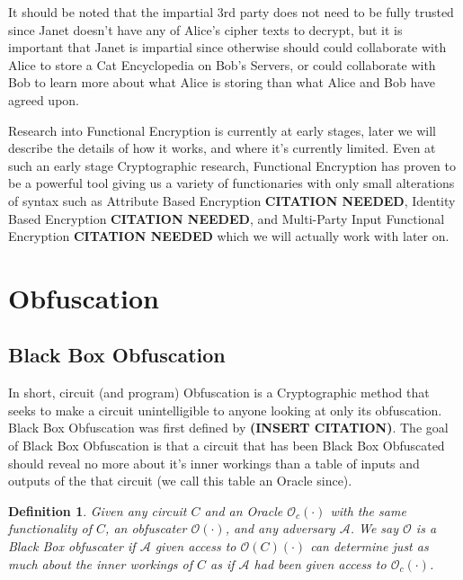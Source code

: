 \documentclass[12pt,twoside]{reedthesis}
\newtheorem{definition}{Definition}
\begin{document}
\par It should be noted that the impartial 3rd party does not need to be fully trusted since Janet doesn't have any of Alice's cipher texts to decrypt, but it is important that Janet is impartial since otherwise should could collaborate with Alice to store a Cat Encyclopedia on Bob's Servers, or could collaborate with Bob to learn more about what Alice is storing than what Alice and Bob have agreed upon.


\par Research into Functional Encryption is currently at early stages, later we will describe the details of how it works, and where it's currently limited. Even at such an early stage Cryptographic research, Functional Encryption has proven to be a powerful tool giving us a variety of functionaries with only small alterations of syntax such as Attribute Based Encryption \textbf{CITATION NEEDED}, Identity Based Encryption \textbf{CITATION NEEDED}, and Multi-Party Input Functional Encryption \textbf{CITATION NEEDED} which we will actually work with later on. 

    
    

    \section{Obfuscation}
    
    \subsection{Black Box Obfuscation}
    In short, circuit (and program) Obfuscation is a Cryptographic method that seeks to make a circuit
    unintelligible to anyone looking at only its obfuscation. Black Box Obfuscation was first defined by
    \textbf{(INSERT CITATION)}. The goal of Black Box Obfuscation is that a circuit that has been Black Box Obfuscated should reveal no more about it's inner workings than a table of inputs and outputs of the that circuit (we call this table an Oracle since).
    
    \begin{definition}
    Given any circuit $C$ and an Oracle $\mathcal{O}_c(\cdot)$ with the same functionality of $C$, an obfuscater $\mathcal{O}(\cdot)$, and any adversary $\mathcal{A}$. We say $\mathcal{O}$ is a Black Box obfuscater if $\mathcal{A}$ given access to $\mathcal{O}(C)(\cdot)$ can determine just as much about the inner workings of $C$ as if $\mathcal{A}$ had been given access to $\mathcal{O}_c(\cdot)$.
   
    
    \end{definition}
    
\end{document}
